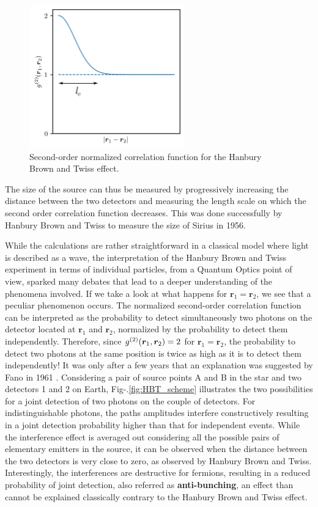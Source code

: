 \begin{figure}
    \centering
    \includegraphics[width=0.6\textwidth]{Fig/Chapter1/g2_HBT_illu.png}
    \caption[Second-order normalized correlation function for the Hanbury Brown and Twiss effect]{Second-order normalized correlation function for the Hanbury Brown and Twiss effect.}
    \label{fig:g2_HBT_illu}
\end{figure}

\noindent The size of the source can thus be measured by progressively increasing the distance between the two detectors and measuring the length scale on which the second order correlation function decreases. This was done successfully by Hanbury Brown and Twiss \cite{brown1956test} to measure the size of Sirius in 1956.

While the calculations are rather straightforward in a classical model where light is described as a wave, the interpretation of the Hanbury Brown and Twiss experiment in terms of individual particles, \ie from a Quantum Optics point of view, sparked many debates that lead to a deeper understanding of the phenomena involved. If we take a look at what happens for $\bm{r}_1=\bm{r}_2$, we see that a peculiar phenomenon occurs. The normalized second-order correlation function can be interpreted as the probability to detect simultaneously two photons on the detector located at $\bm{r}_1$ and $\bm{r}_2$, normalized by the probability to detect them independently. Therefore, since $g^{(2)} (\bm{r}_1,\bm{r}_2)=2$ for $\bm{r}_1=\bm{r}_2$, the probability to detect two photons at the same position is twice as high as it is to detect them independently! It was only after a few years that an explanation was suggested by Fano in 1961 \cite{fano1961quantum}. Considering a pair of source points A and B in the star and two detectors 1 and 2 on Earth, Fig-.\ref{fig:HBT_scheme} illustrates the two possibilities for a joint detection of two photons on the couple of detectors. For indistinguishable photons, the paths amplitudes interfere constructively resulting in a joint detection probability higher than that for independent events. While the interference effect is averaged out considering all the possible pairs of elementary emitters in the source, it can be observed when the distance between the two detectors is very close to zero, as observed by Hanbury Brown and Twiss. Interestingly, the interferences are destructive for fermions, resulting in a reduced probability of joint detection, also referred as \textbf{anti-bunching}, an effect than cannot be explained classically contrary to the Hanbury Brown and Twiss effect. 

